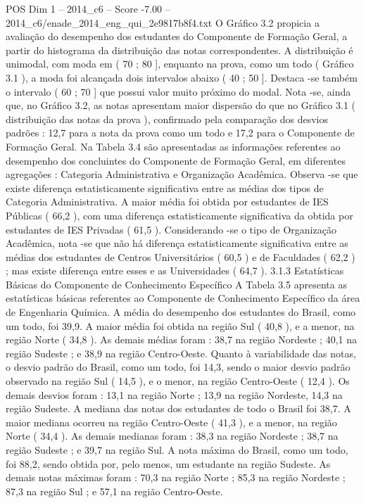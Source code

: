 \begin{textsample}{POS Dim 1 – 2014\_c6 – Score -7.00 – 2014\_c6/enade\_2014\_eng\_qui\_2e9817b8f4.txt}
O Gráfico 3.2 propicia a avaliação do desempenho dos estudantes do Componente de Formação Geral, a partir do histograma da distribuição das notas correspondentes.
A distribuição é unimodal, com moda em ( 70 ; 80 ], enquanto na prova, como um todo ( Gráfico 3.1 ), a moda foi alcançada dois intervalos abaixo ( 40 ; 50 ].
Destaca -se também o intervalo ( 60 ; 70 ] que possui valor muito próximo do modal.
Nota -se, ainda que, no Gráfico 3.2, as notas apresentam maior dispersão do que no Gráfico 3.1 ( distribuição das notas da prova ), confirmado pela comparação dos desvios padrões : 12,7 para a nota da prova como um todo e 17,2 para o Componente de Formação Geral.
Na Tabela 3.4 são apresentadas as informações referentes ao desempenho dos concluintes do Componente de Formação Geral, em diferentes agregações : Categoria Administrativa e Organização Acadêmica.
Observa -se que existe diferença estatisticamente significativa entre as médias dos tipos de Categoria Administrativa.
A maior média foi obtida por estudantes de IES Públicas ( 66,2 ), com uma diferença estatisticamente significativa da obtida por estudantes de IES Privadas ( 61,5 ).
Considerando -se o tipo de Organização Acadêmica, nota -se que não há diferença estatisticamente significativa entre as médias dos estudantes de Centros Universitários ( 60,5 ) e de Faculdades ( 62,2 ) ; mas existe diferença entre esses e as Universidades ( 64,7 ). 3.1.3 Estatísticas Básicas do Componente de Conhecimento Específico A Tabela 3.5 apresenta as estatísticas básicas referentes ao Componente de Conhecimento Específico da área de Engenharia Química.
A média do desempenho dos estudantes do Brasil, como um todo, foi 39,9.
A maior média foi obtida na região Sul ( 40,8 ), e a menor, na região Norte ( 34,8 ).
As demais médias foram : 38,7 na região Nordeste ; 40,1 na região Sudeste ; e 38,9 na região Centro-Oeste.
Quanto à variabilidade das notas, o desvio padrão do Brasil, como um todo, foi 14,3, sendo o maior desvio padrão observado na região Sul ( 14,5 ), e o menor, na região Centro-Oeste ( 12,4 ).
Os demais desvios foram : 13,1 na região Norte ; 13,9 na região Nordeste, 14,3 na região Sudeste.
A mediana das notas dos estudantes de todo o Brasil foi 38,7.
A maior mediana ocorreu na região Centro-Oeste ( 41,3 ), e a menor, na região Norte ( 34,4 ).
As demais medianas foram : 38,3 na região Nordeste ; 38,7 na região Sudeste ; e 39,7 na região Sul.
A nota máxima do Brasil, como um todo, foi 88,2, sendo obtida por, pelo menos, um estudante na região Sudeste.
As demais notas máximas foram : 70,3 na região Norte ; 85,3 na região Nordeste ; 87,3 na região Sul ; e 57,1 na região Centro-Oeste.

\end{textsample}
